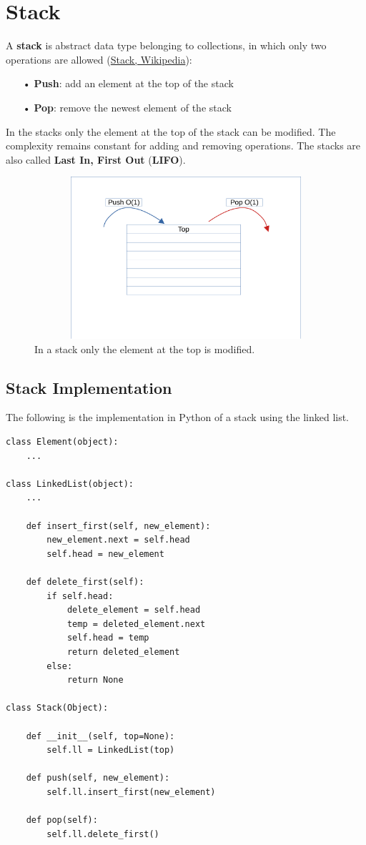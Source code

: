 \section{Stack}
A \textbf{stack} is abstract data type belonging to collections, in which only two operations are allowed \cite{wikistack} (\href{https://en.wikipedia.org/wiki/Stack_(abstract_data_type)}{Stack, Wikipedia}):
\begin{itemize}
\item[•] \textbf{Push}: add an element at the top of the stack
\item[•] \textbf{Pop}: remove the newest element of the stack
\end{itemize}
In the stacks only the element at the top of the stack can be modified. The complexity remains constant for adding and removing operations. The stacks are also called \textbf{Last In, First Out} (\textbf{LIFO}).
\begin{figure}[h]
	\includegraphics[width=14cm,height=6cm]{chapters/datastructures/images/stack_1.pdf}
	\caption[]{In a stack only the element at the top is modified.}
	\label{stack_1}
\end{figure}
\subsection{Stack Implementation}
The following is the implementation in Python of a stack using the linked list.
\begin{lstlisting}[caption={Stack implementation.}]
class Element(object):
	...

class LinkedList(object):
	...
	
	def insert_first(self, new_element):
		new_element.next = self.head
		self.head = new_element
	
	def delete_first(self):
		if self.head:
			delete_element = self.head
			temp = deleted_element.next
			self.head = temp
			return deleted_element
		else:
			return None

class Stack(Object):
	
	def __init__(self, top=None):
		self.ll = LinkedList(top)
		
	def push(self, new_element):
		self.ll.insert_first(new_element)
	
	def pop(self):
		self.ll.delete_first()
\end{lstlisting}

